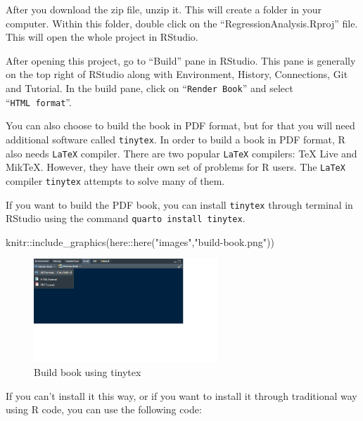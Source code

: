 \documentclass[
  letterpaper,
  twoside,
  openright,
  headsepline,
  footsepline,
  listof = totocnumbered,
  chapterprefix = true,
  titlepage = false]{scrbook}
\newenvironment{Shaded}{\begin{snugshade}}{\end{snugshade}}
\newcommand{\FunctionTok}[1]{\textcolor[rgb]{0.28,0.35,0.67}{#1}}
\newcommand{\NormalTok}[1]{\textcolor[rgb]{0.00,0.23,0.31}{#1}}
\newcommand{\SpecialCharTok}[1]{\textcolor[rgb]{0.37,0.37,0.37}{#1}}
\newcommand{\StringTok}[1]{\textcolor[rgb]{0.13,0.47,0.30}{#1}}
\begin{document}
After you download the zip file, unzip it. This will create a folder in
your computer. Within this folder, double click on the
``RegressionAnalysis.Rproj'' file. This will open the whole project in
RStudio.

After opening this project, go to ``Build'' pane in RStudio. This pane
is generally on the top right of RStudio along with Environment,
History, Connections, Git and Tutorial. In the build pane, click on
``\texttt{Render\ Book}'' and select ``\texttt{HTML\ format}''.

You can also choose to build the book in PDF format, but for that you
will need additional software called \texttt{tinytex}. In order to build
a book in PDF format, R also needs \texttt{LaTeX} compiler. There are
two popular \texttt{LaTeX} compilers: TeX Live and MikTeX. However, they
have their own set of problems for R users. The \texttt{LaTeX} compiler
\texttt{tinytex} attempts to solve many of them.

If you want to build the PDF book, you can install \texttt{tinytex}
through terminal in RStudio using the command
\texttt{quarto\ install\ tinytex}.

\begin{Shaded}
\begin{Highlighting}[numbers=left,,]
\NormalTok{knitr}\SpecialCharTok{::}\FunctionTok{include\_graphics}\NormalTok{(here}\SpecialCharTok{::}\FunctionTok{here}\NormalTok{(}\StringTok{"images"}\NormalTok{,}\StringTok{"build{-}book.png"}\NormalTok{))}
\end{Highlighting}
\end{Shaded}

\begin{figure}[H]

{\centering \includegraphics[width=2.73in,height=\textheight]{images/build-book.png}

}

\caption{\label{fig-build-book}Build book using tinytex}

\end{figure}

If you can't install it this way, or if you want to install it through
traditional way using R code, you can use the following code:
\end{document}
